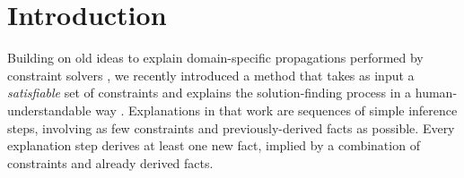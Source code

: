\documentclass[twoside,11pt]{article}
\newcommand\comment[1]{\marginpar{\tiny #1}}
\renewcommand\comment[1]{#1}
\newcommand{\emilio}[1]{{\comment{\color{red}Emilio: #1}}}
\newcommand{\bart}[1]{{\comment{\color{OliveGreen}Bart: #1}}}
\begin{document}
\section{Introduction}
\label{sec:introduction}
%





Building on old ideas to explain domain-specific propagations performed by constraint solvers \cite{sqalli1996inference,freuder2001explanation}, we recently introduced a method that takes as input a \emph{satisfiable} set of constraints
and explains the solution-finding process in a human-understandable way \cite{ecai/BogaertsGCG20}. 
Explanations in that work are sequences of simple inference steps, 
involving as few constraints and previously-derived facts as possible. Every explanation step derives at least one new fact, implied by a combination of constraints and already derived facts.
\end{document}
